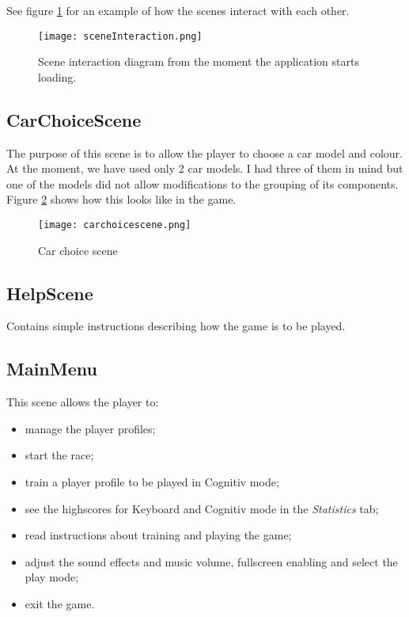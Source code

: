 See figure \ref{fig:sceneInteraction} for an example of how the scenes interact with each other.

\begin{figure}
  \centering
  \texttt{[image: sceneInteraction.png]}
  \caption{Scene interaction diagram from the moment the application starts loading.}
    \label{fig:sceneInteraction}           
\end{figure}

\subsection{CarChoiceScene}
The purpose of this scene is to allow the player to choose a car model and colour. At the moment, we have used only 2 car models. I had three of them in mind but one of the models did not allow modifications to the grouping of its components. Figure \ref{fig:carchoicescene} shows how this looks like in the game.

\begin{figure}
  \centering
  \texttt{[image: carchoicescene.png]}
  \caption{Car choice scene}
    \label{fig:carchoicescene}           
\end{figure}

\subsection{HelpScene}
Contains simple instructions describing how the game is to be played. 

\subsection{MainMenu}
This scene allows the player to:
\begin{itemize}
	\item manage the player profiles;
	\item start the race;
	\item train a player profile to be played in Cognitiv mode;
	\item see the highscores for Keyboard and Cognitiv mode in the \textit{Statistics} tab;
	\item read instructions about training and playing the game;
	\item adjust the sound effects and music volume, fullscreen enabling and select the play mode;
	\item exit the game.
\end{itemize}

